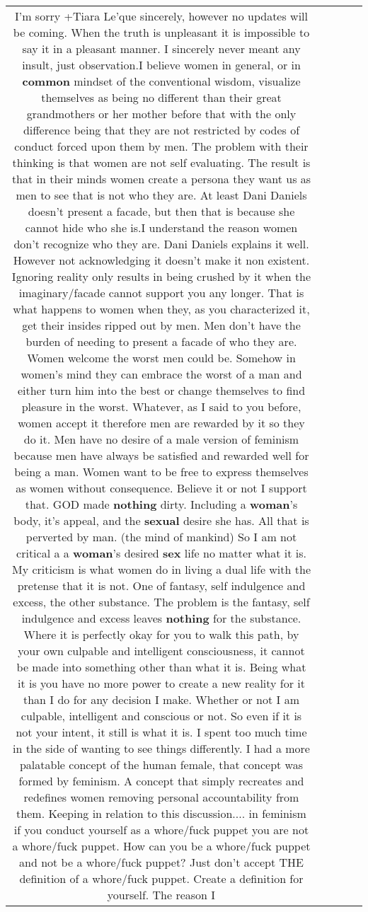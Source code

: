 \documentclass[11pt]{article}
\newlength\mylength
\begin{document}
\begin{center}
\begin{longtable}{|C{.65\mylength}|C{.30\mylength}|C{.12\mylength}|C{.12\mylength}|C{.12\mylength}|}
  \small I'm sorry +Tiara Le'que sincerely, however no updates will be coming. When the truth is unpleasant it is impossible to say it in a pleasant manner. I sincerely never meant any insult, just observation.I believe women in general, or in \textbf{common} mindset of the conventional wisdom, visualize themselves as being no different than their great grandmothers or her mother before that with the only difference being that they are not restricted by codes of conduct forced upon them by men. The problem with their thinking is that women are not self evaluating. The result is that in their minds women create a persona they want us as men to see that is not who they are. At least Dani Daniels doesn't present a facade, but then that is because she cannot hide who she is.I understand the reason women don't recognize who they are. Dani Daniels explains it well. However not acknowledging it doesn't make it non existent. Ignoring reality only results in being crushed by it when the imaginary/facade cannot support you any longer. That is what happens to women when they, as you characterized it, get their insides ripped out by men. Men don't have the burden of needing to present a facade of who they are. Women welcome the worst men could be. Somehow in women's mind they can embrace the worst of a man and either turn him into the best or change themselves to find pleasure in the worst. Whatever, as I said to you before, women accept it therefore men are rewarded by it so they do it. Men have no desire of a male version of feminism because men have always be satisfied and rewarded well for being a man. Women want to be free to express themselves as women without consequence. Believe it or not I support that. GOD made \textbf{nothing} dirty. Including a \textbf{woman}'s body, it's appeal, and the \textbf{sexual} desire she has. All that is perverted by man. (the mind of mankind) So I am not critical a a \textbf{woman}'s desired \textbf{sex} life no matter what it is. My criticism is what women do in living a dual life with the pretense that it is not. One of fantasy, self indulgence and excess, the other substance. The problem is the fantasy, self indulgence and excess leaves \textbf{nothing} for the substance. Where it is perfectly okay for you to walk this path, by your own culpable and intelligent consciousness, it cannot be made into something other than what it is. Being what it is you have no more power to create a new reality for it than I do for any decision I make. Whether or not I am culpable, intelligent and conscious or not. So even if it is not your intent, it still is what it is. I spent too much time in the side of wanting to see things differently. I had a more palatable concept of the human female, that concept was formed by feminism. A concept that simply recreates and redefines women removing personal accountability from them. Keeping in relation to this discussion.... in feminism if you conduct yourself as a whore/fuck puppet you are not a whore/fuck puppet. How can you be a whore/fuck puppet and not be a whore/fuck puppet? Just don't accept THE definition of a whore/fuck puppet. Create a definition for yourself. The reason I 
\end{longtable}
\end{center}
\end{document}

